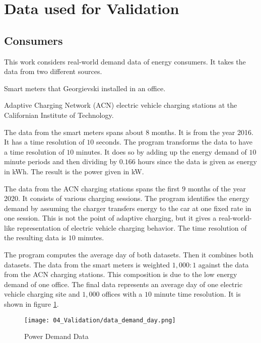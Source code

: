 \section{Data used for Validation}
\label{validation:data}

\subsection{Consumers}

This work considers real-world demand data of energy consumers.
It takes the data from two different sources.
\begin{enumerate*}[label=(\roman*)]
  \item Smart meters that Georgievski \citeauthor{Georgievski2012} installed in an office. \cite{Georgievski2012}
  \item Adaptive Charging Network (ACN) electric vehicle charging stations at the Californian Institute of Technology. \cite{Lee2019, ACNCaltech2020}
\end{enumerate*}

The data from the smart meters spans about $8$ months.
It is from the year 2016.
It has a time resolution of $10$ seconds.
The program transforms the data to have a time resolution of $10$ minutes.
It does so by adding up the energy demand of $10$ minute periods and then dividing by $0.166$ hours since the data is given as energy in kWh.
The result is the power given in kW.

The data from the ACN charging stations spans the first $9$ months of the year 2020.
It consists of various charging sessions.
The program identifies the energy demand by assuming the charger transfers energy to the car at one fixed rate in one session.
This is not the point of adaptive charging, but it gives a real-world-like representation of electric vehicle charging behavior.
The time resolution of the resulting data is $10$ minutes.

The program computes the average day of both datasets.
Then it combines both datasets.
The data from the smart meters is weighted $1, 000 : 1$ against the data from the ACN charging stations.
This composition is due to the low energy demand of one office.
The final data represents an average day of one electric vehicle charging site and $1, 000$ offices with a $10$ minute time resolution.
It is shown in figure \ref{figure:data.demand.day}.

\begin{figure}
  \centering
  \texttt{[image: 04\_Validation/data\_demand\_day.png]}
  \caption{Power Demand Data}
  \label{figure:data.demand.day}
\end{figure}

